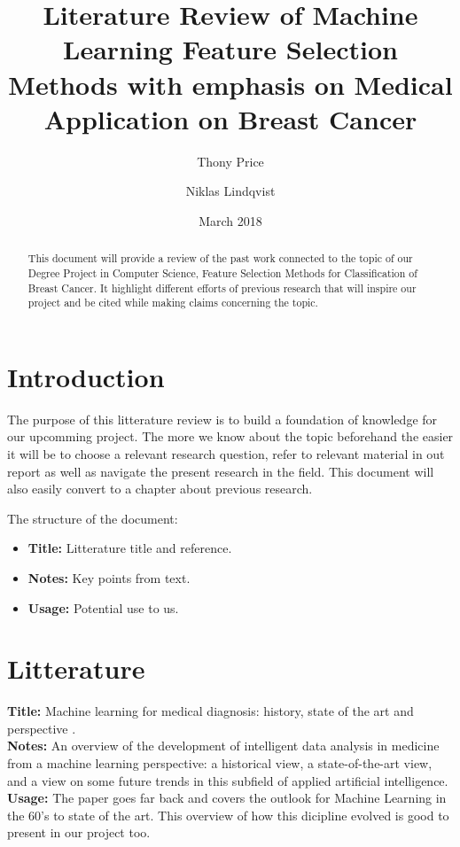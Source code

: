 \documentclass[a4paper]{article}
\title{Literature Review of Machine Learning Feature Selection Methods with emphasis on Medical Application on Breast Cancer}
\author{Thony Price \and Niklas Lindqvist}
\date{March 2018}
\begin{document}
\maketitle

\begin{abstract}

This document will provide a review of the past work connected to the topic of our Degree Project in Computer Science, Feature Selection Methods for Classification of Breast Cancer. It highlight different efforts of previous research that will inspire our project and be cited while making claims concerning the topic.

\end{abstract}

\section{Introduction}

The purpose of this litterature review is to build a foundation of knowledge for our upcomming project. The more we know about the topic beforehand the easier it will be to choose a relevant research question, refer to relevant material in out report as well as navigate the present research in the field. This document will also easily convert to a chapter about previous research.
\\\par

\noindent The structure of the document:
\begin{itemize} \itemsep0pt \parskip0pt 
	\item \textbf{Title:} Litterature title and reference.
	\item \textbf{Notes:} Key points from text.
	\item \textbf{Usage:} Potential use to us.
\end{itemize}

\section{Litterature}

\textbf{Title:} Machine learning for medical diagnosis: history, state of the art and perspective \cite{kononenko2001}.
\\
\textbf{Notes:} An overview of the development of intelligent data analysis in medicine from a machine learning perspective: a historical view, a state-of-the-art view, and a view on some future trends in this subfield of applied artificial intelligence.
\\
\textbf{Usage:} The paper goes far back and covers the outlook for Machine Learning in the 60's to state of the art. This overview of how this dicipline evolved is good to present in our project too.
\\\par
\end{document}
